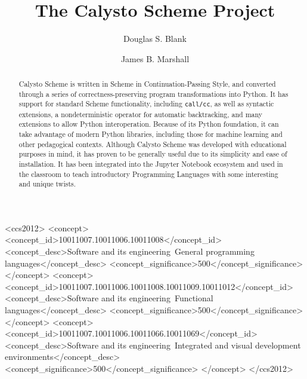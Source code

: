 \documentclass[acmsmall,screen,nonacm]{acmart}
\begin{document}
\title{The Calysto Scheme Project}

\author{Douglas S. Blank}

\author{James B. Marshall}

\renewcommand{\shortauthors}{D. S. Blank and J. B. Marshall}

\begin{abstract}
Calysto Scheme is written in Scheme in Continuation-Passing Style, and
converted through a series of correctness-preserving program transformations
into Python. It has support for standard Scheme functionality, including
\texttt{call/cc}, as well as syntactic extensions, a nondeterministic operator
for automatic backtracking, and many extensions to allow Python
interoperation. Because of its Python foundation, it can take advantage of
modern Python libraries, including those for machine learning and other
pedagogical contexts. Although Calysto Scheme was developed with educational
purposes in mind, it has proven to be generally useful due to its simplicity
and ease of installation. It has been integrated into the Jupyter Notebook
ecosystem and used in the classroom to teach introductory Programming Languages
with some interesting and unique twists.
\end{abstract}

\begin{CCSXML}
<ccs2012>
<concept>
<concept_id>10011007.10011006.10011008</concept_id>
<concept_desc>Software and its engineering~General programming languages</concept_desc>
<concept_significance>500</concept_significance>
</concept>
<concept>
<concept_id>10011007.10011006.10011008.10011009.10011012</concept_id>
<concept_desc>Software and its engineering~Functional languages</concept_desc>
<concept_significance>500</concept_significance>
</concept>
<concept>
<concept_id>10011007.10011006.10011066.10011069</concept_id>
<concept_desc>Software and its engineering~Integrated and visual development environments</concept_desc>
<concept_significance>500</concept_significance>
</concept>
</ccs2012>
\end{CCSXML}
\end{document}

